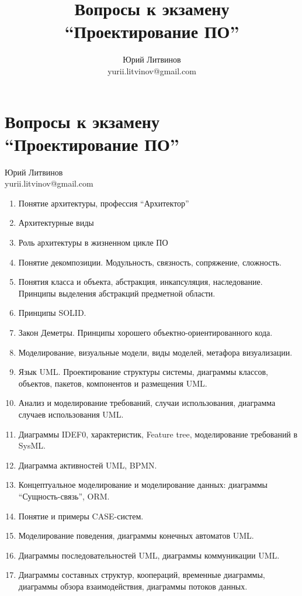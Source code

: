\documentclass[a5paper]{article}
\title{Вопросы к экзамену ``Проектирование ПО''}
\author{Юрий Литвинов\\\small{yurii.litvinov@gmail.com}}
\begin{document}
\thispagestyle{empty}

\section*{Вопросы к экзамену ``Проектирование ПО''}

\begin{flushright}\begin{small}Юрий Литвинов\\\small{yurii.litvinov@gmail.com}\end{small}\end{flushright}

\begin{enumerate}
	\item Понятие архитектуры, профессия ``Архитектор''
	\item Архитектурные виды 
	\item Роль архитектуры в жизненном цикле ПО
	\item Понятие декомпозиции. Модульность, связность, сопряжение, сложность.
	\item Понятия класса и объекта, абстракция, инкапсуляция, наследование. Принципы выделения абстракций предметной области.
	\item Принципы SOLID.
	\item Закон Деметры. Принципы хорошего объектно-ориентированного кода.
	\item Моделирование, визуальные модели, виды моделей, метафора визуализации.
	\item Язык UML. Проектирование структуры системы, диаграммы классов, объектов, пакетов, компонентов и размещения UML.
	\item Анализ и моделирование требований, случаи использования, диаграмма случаев использования UML.
	\item Диаграммы IDEF0, характеристик, Feature tree, моделирование требований в SysML.
	\item Диаграмма активностей UML, BPMN.
	\item Концептуальное моделирование и моделирование данных: диаграммы ``Сущность-связь'', ORM.
	\item Понятие и примеры CASE-систем.
	\item Моделирование поведения, диаграммы конечных автоматов UML.
	\item Диаграммы последовательностей UML, диаграммы коммуникации UML.
	\item Диаграммы составных структур, коопераций, временные диаграммы, диаграммы обзора взаимодействия, диаграммы потоков данных.

\end{enumerate}
\end{document}
